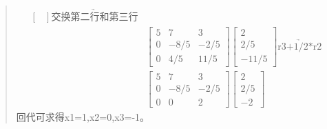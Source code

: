 \documentclass[UTF8]{ctexart}
\begin{document}
\begin{quote}
\begin{equation}
\begin{aligned}
\begin{bmatrix}
		\end{bmatrix}
	\underrightarrow{\text{交换第二行和第三行}}
	\\
	&\begin{bmatrix}
		5&7& 3\\ 0 &-8/5 &-2/5\\ 0 & 4/5 & 11/5
	\end{bmatrix}
	\begin{bmatrix}
		2\\ 2/5 \\ -11/5 
	\end{bmatrix}
	\underrightarrow{\text{r3+1/2*r2}}
\\
&\begin{bmatrix}
	5&7& 3\\ 0 &-8/5 &-2/5\\ 0 & 0 & 2
\end{bmatrix}
\begin{bmatrix}
	2 \\ 2/5 \\ -2
\end{bmatrix}
	\end{aligned}
\end{equation}
 回代可求得x1=1,x2=0,x3=-1。
\end{quote}
\end{document}
